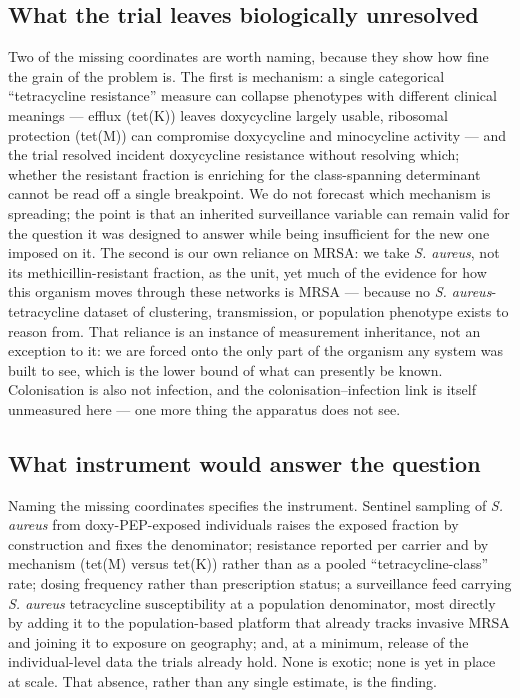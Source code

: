 \documentclass[10pt,letterpaper]{article}
\begin{document}
\subsection*{What the trial leaves biologically unresolved}

Two of the missing coordinates are worth naming, because they show how
fine the grain of the problem is. The first is mechanism: a single
categorical ``tetracycline resistance'' measure can collapse phenotypes
with different clinical meanings --- efflux (tet(K)) leaves doxycycline
largely usable, ribosomal protection (tet(M)) can compromise doxycycline and minocycline activity \cite{liu2011, grossman2016} --- and the trial
resolved incident doxycycline resistance without resolving which;
whether the resistant fraction is enriching for the class-spanning
determinant cannot be read off a single breakpoint. We do not forecast
which mechanism is spreading; the point is that an inherited
surveillance variable can remain valid for the question it was designed
to answer while being insufficient for the new one imposed on it. The
second is our own reliance on MRSA: we take \emph{S. aureus}, not its
methicillin-resistant fraction, as the unit, yet much of the evidence
for how this organism moves through these networks is MRSA --- because
no \emph{S. aureus}-tetracycline dataset of clustering, transmission, or
population phenotype exists to reason from. That reliance is an instance
of measurement inheritance, not an exception to it: we are forced onto
the only part of the organism any system was built to see, which is the
lower bound of what can presently be known. Colonisation is also not
infection, and the colonisation--infection link is itself unmeasured
here --- one more thing the apparatus does not see.

\subsection*{What instrument would answer the question}

Naming the missing coordinates specifies the instrument. Sentinel
sampling of \emph{S. aureus} from doxy-PEP-exposed individuals raises
the exposed fraction by construction and fixes the denominator;
resistance reported per carrier and by mechanism (tet(M) versus tet(K))
rather than as a pooled ``tetracycline-class'' rate; dosing frequency
rather than prescription status; a surveillance feed carrying \emph{S.
aureus} tetracycline susceptibility at a population denominator, most
directly by adding it to the population-based platform that already
tracks invasive MRSA and joining it to exposure on geography; and, at a
minimum, release of the individual-level data the trials already hold.
None is exotic; none is yet in place at scale. That absence, rather than
any single estimate, is the finding.
\end{document}
